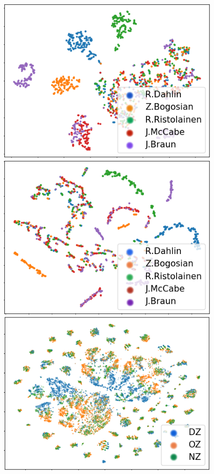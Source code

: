 \documentclass[letterpaper]{article} %
\begin{document}
\begin{figure}[htbp]
\begin{minipage}[b]{.5\columnwidth}
        \includegraphics[width=0.95\columnwidth]{figures/embedding-visualization-defence.png}
    \end{minipage}%
    \begin{minipage}[b]{.5\columnwidth}
        \centering
        \includegraphics[width=0.95\columnwidth]{figures/embedding-visualization-caernn-defence.png}
    \end{minipage}\par\smallskip
    \begin{minipage}[b]{.5\columnwidth}
        \centering
        \includegraphics[width=0.95\columnwidth]{./figures/embedding-visualization-zone.png}

\end{minipage}
\end{figure}
\end{document}
